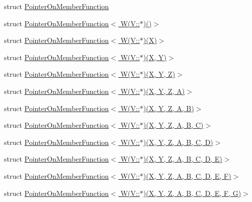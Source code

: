 \begin{DoxyCompactItemize}
\item 
struct \hyperlink{structutilspp_1_1PointerOnMemberFunction}{Pointer\-On\-Member\-Function}
\item 
struct \hyperlink{structutilspp_1_1PointerOnMemberFunction_3_01W_07V_1_1_5_08_07_08_4}{Pointer\-On\-Member\-Function$<$ W(\-V\-::$\ast$)()$>$}
\item 
struct \hyperlink{structutilspp_1_1PointerOnMemberFunction_3_01W_07V_1_1_5_08_07X_08_4}{Pointer\-On\-Member\-Function$<$ W(\-V\-::$\ast$)(\-X)$>$}
\item 
struct \hyperlink{structutilspp_1_1PointerOnMemberFunction_3_01W_07V_1_1_5_08_07X_00_01Y_08_4}{Pointer\-On\-Member\-Function$<$ W(\-V\-::$\ast$)(\-X, Y)$>$}
\item 
struct \hyperlink{structutilspp_1_1PointerOnMemberFunction_3_01W_07V_1_1_5_08_07X_00_01Y_00_01Z_08_4}{Pointer\-On\-Member\-Function$<$ W(\-V\-::$\ast$)(\-X, Y, Z)$>$}
\item 
struct \hyperlink{structutilspp_1_1PointerOnMemberFunction_3_01W_07V_1_1_5_08_07X_00_01Y_00_01Z_00_01A_08_4}{Pointer\-On\-Member\-Function$<$ W(\-V\-::$\ast$)(\-X, Y, Z, A)$>$}
\item 
struct \hyperlink{structutilspp_1_1PointerOnMemberFunction_3_01W_07V_1_1_5_08_07X_00_01Y_00_01Z_00_01A_00_01B_08_4}{Pointer\-On\-Member\-Function$<$ W(\-V\-::$\ast$)(\-X, Y, Z, A, B)$>$}
\item 
struct \hyperlink{structutilspp_1_1PointerOnMemberFunction_3_01W_07V_1_1_5_08_07X_00_01Y_00_01Z_00_01A_00_01B_00_01C_08_4}{Pointer\-On\-Member\-Function$<$ W(\-V\-::$\ast$)(\-X, Y, Z, A, B, C)$>$}
\item 
struct \hyperlink{structutilspp_1_1PointerOnMemberFunction_3_01W_07V_1_1_5_08_07X_00_01Y_00_01Z_00_01A_00_01B_00_01C_00_01D_08_4}{Pointer\-On\-Member\-Function$<$ W(\-V\-::$\ast$)(\-X, Y, Z, A, B, C, D)$>$}
\item 
struct \hyperlink{structutilspp_1_1PointerOnMemberFunction_3_01W_07V_1_1_5_08_07X_00_01Y_00_01Z_00_01A_00_01B_00_01C_00_01D_00_01E_08_4}{Pointer\-On\-Member\-Function$<$ W(\-V\-::$\ast$)(\-X, Y, Z, A, B, C, D, E)$>$}
\item 
struct \hyperlink{structutilspp_1_1PointerOnMemberFunction_3_01W_07V_1_1_5_08_07X_00_01Y_00_01Z_00_01A_00_01B_00_01C_00_01D_00_01E_00_01F_08_4}{Pointer\-On\-Member\-Function$<$ W(\-V\-::$\ast$)(\-X, Y, Z, A, B, C, D, E, F)$>$}
\item 
struct \hyperlink{structutilspp_1_1PointerOnMemberFunction_3_01W_07V_1_1_5_08_07X_00_01Y_00_01Z_00_01A_00_01B_00_052975cfd5a0b2be63fce3f8de7f60f64}{Pointer\-On\-Member\-Function$<$ W(\-V\-::$\ast$)(\-X, Y, Z, A, B, C, D, E, F, G)$>$}

\end{DoxyCompactItemize}
